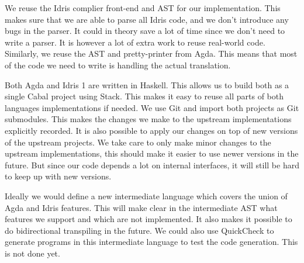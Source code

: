 \documentclass[parskip=half]{scrartcl}
\begin{document}
We reuse the Idris complier front-end and AST for our implementation. This
makes sure that we are able to parse all Idris code, and we don't introduce any
bugs in the parser. It could in theory save a lot of time since we don't need
to write a parser. It is however a lot of extra work to reuse real-world code.
Similarly, we reuse the AST and pretty-printer from Agda. This means that most
of the code we need to write is handling the actual translation.

Both Agda and Idris 1 are written in Haskell.  This allows us to build both as
a single Cabal project using Stack.  This makes it easy to reuse all parts of
both languages implementations if needed.  We use Git and import both projects
as Git submodules. This makes the changes we make to the upstream
implementations explicitly recorded. It is also possible to apply our changes
on top of new versions of the upstream projects.  We take care to only make
minor changes to the upstream implementations, this should make it easier to
use newer versions in the future.  But since our code depends a lot on internal
interfaces, it will still be hard to keep up with new versions.




Ideally we would define a new intermediate language which covers the union of
Agda and Idris features.  This will make clear in the intermediate AST what
features we support and which are not implemented. It also makes it possible to
do bidirectional transpiling in the future.  We could also use QuickCheck to
generate programs in this intermediate language to test the code generation.
This is not done yet.
\end{document}
